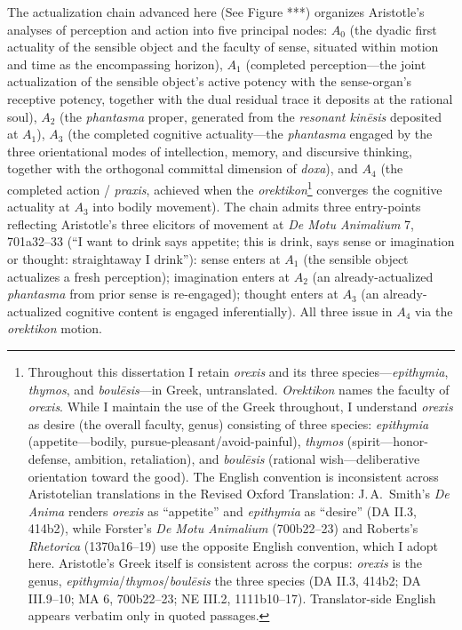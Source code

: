 \documentclass{article}
\begin{document}
The actualization chain advanced here (See Figure ***) organizes Aristotle's analyses of perception and action into five principal nodes: $A_0$ (the dyadic first actuality of the sensible object and the faculty of sense, situated within motion and time as the encompassing horizon), $A_1$ (completed perception---the joint actualization of the sensible object's active potency with the sense-organ's receptive potency, together with the dual residual trace it deposits at the rational soul), $A_2$ (the \textit{phantasma} proper, generated from the \textit{resonant kinēsis} deposited at $A_1$), $A_3$ (the completed cognitive actuality---the \textit{phantasma} engaged by the three orientational modes of intellection, memory, and discursive thinking, together with the orthogonal committal dimension of \textit{doxa}), and $A_4$ (the completed action / \textit{praxis}, achieved when the \textit{orektikon}\footnote{Throughout this dissertation I retain \textit{orexis} and its three species---\textit{epithymia}, \textit{thymos}, and \textit{boulēsis}---in Greek, untranslated. \textit{Orektikon} names the faculty of \textit{orexis}. While I maintain the use of the Greek throughout, I understand \textit{orexis} as desire (the overall faculty, genus) consisting of three species: \textit{epithymia} (appetite---bodily, pursue-pleasant/avoid-painful), \textit{thymos} (spirit---honor-defense, ambition, retaliation), and \textit{boulēsis} (rational wish---deliberative orientation toward the good). The English convention is inconsistent across Aristotelian translations in the Revised Oxford Translation: J.\,A.\ Smith's \textit{De Anima} renders \textit{orexis} as ``appetite'' and \textit{epithymia} as ``desire'' (DA II.3, 414b2), while Forster's \textit{De Motu Animalium} (700b22--23) and Roberts's \textit{Rhetorica} (1370a16--19) use the opposite English convention, which I adopt here. Aristotle's Greek itself is consistent across the corpus: \textit{orexis} is the genus, \textit{epithymia}/\textit{thymos}/\textit{boulēsis} the three species (DA II.3, 414b2; DA III.9--10; MA 6, 700b22--23; NE III.2, 1111b10--17). Translator-side English appears verbatim only in quoted passages.} converges the cognitive actuality at $A_3$ into bodily movement). The chain admits three entry-points reflecting Aristotle's three elicitors of movement at \textit{De Motu Animalium} 7, 701a32--33 (``I want to drink says appetite; this is drink, says sense or imagination or thought: straightaway I drink''): sense enters at $A_1$ (the sensible object actualizes a fresh perception); imagination enters at $A_2$ (an already-actualized \textit{phantasma} from prior sense is re-engaged); thought enters at $A_3$ (an already-actualized cognitive content is engaged inferentially). All three issue in $A_4$ via the \textit{orektikon} motion. 
\end{document}
